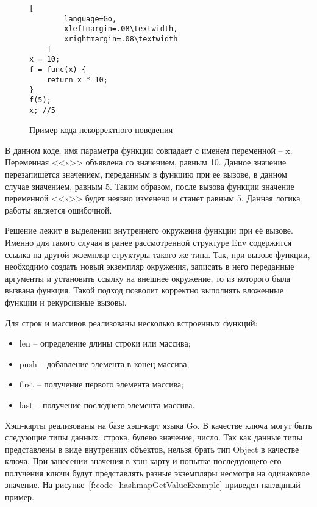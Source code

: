 \begin{figure}[!htb]
	\centering
    \vspace{\toppaddingoffigure}
	\begin{lstlisting}[
        language=Go,
        xleftmargin=.08\textwidth,
        xrightmargin=.08\textwidth
    ]
x = 10;
f = func(x) {
    return x * 10;
}
f(5);
x; //5
\end{lstlisting}
	\caption{Пример кода некорректного поведения}
	\label{f:code_rewriteVarError}
\end{figure}

В данном коде, имя параметра функции совпадает с именем переменной -- x.
Переменная <<x>> объявлена со значением, равным 10.
Данное значение перезапишется значением, переданным в функцию при ее вызове, в данном случае значением, равным 5.
Таким образом, после вызова функции значение переменной <<x>> будет неявно изменено и станет равным 5.
Данная логика работы является ошибочной.

Решение лежит в выделении внутреннего окружения функции при её вызове.
Именно для такого случая в ранее рассмотренной структуре Env содержится ссылка на другой экземпляр структуры такого же типа.
Так, при вызове функции, необходимо создать новый экземпляр окружения, записать в него переданные аргументы и установить ссылку на внешнее окружение,
то из которого была вызвана функция. Такой подход позволит корректно выполнять вложенные функции и рекурсивные вызовы.

Для строк и массивов реализованы несколько встроенных функций:

\begin{itemize}
    \item len -- определение длины строки или массива;
    \item push -- добавление элемента в конец массива;
    \item first -- получение первого элемента массива;
    \item last -- получение последнего элемента массива.
\end{itemize}

Хэш-карты реализованы на базе хэш-карт языка Go.
В качестве ключа могут быть следующие типы данных: строка, булево значение, число.
Так как данные типы представлены в виде внутренних объектов, нельзя брать тип Object в качестве ключа.
При занесении значения в хэш-карту и попытке последующего его получения ключи будут представлять разные экземпляры несмотря на одинаковое значение.
На рисунке~\ref{f:code_hashmapGetValueExample} приведен наглядный пример.

